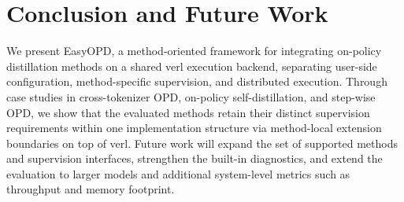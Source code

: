 \section{Conclusion and Future Work}

We present EasyOPD, a method-oriented framework for integrating on-policy distillation methods on a shared verl execution backend, separating user-side configuration, method-specific supervision, and distributed execution. Through case studies in cross-tokenizer OPD, on-policy self-distillation, and step-wise OPD, we show that the evaluated methods retain their distinct supervision requirements within one implementation structure via method-local extension boundaries on top of verl. Future work will expand the set of supported methods and supervision interfaces, strengthen the built-in diagnostics, and extend the evaluation to larger models and additional system-level metrics such as throughput and memory footprint.

